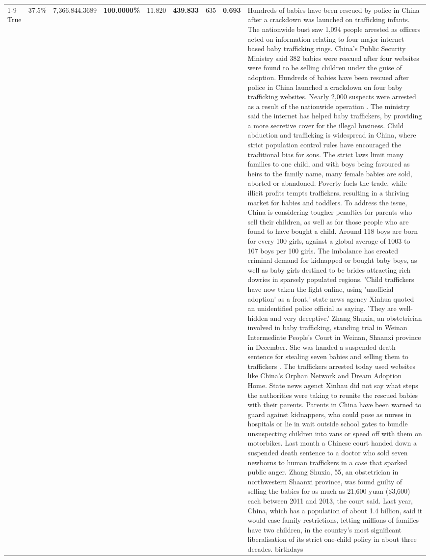 \begin{table}[H]
\begin{tabular}{lllrlllll}
\cline{1-9}
True & 37.5\% & 7,366,844.3689 & \bfseries \color{red} 100.0000\% & 11.820 & \bfseries \color{red} 439.833 & 635 & \bfseries \color{red} 0.693 & Hundreds of babies have been rescued by police in China after a crackdown was launched on trafficking infants. The nationwide bust saw 1,094 people arrested as officers acted on information relating to four major internet-based baby trafficking rings. China's Public Security Ministry said 382 babies were rescued after four websites were found to be selling children under the guise of adoption. Hundreds of babies have been rescued after police in China launched a crackdown on four baby trafficking websites. Nearly 2,000 suspects were arrested as a result of the nationwide operation . The ministry said the internet has helped baby traffickers, by providing a more secretive cover for the illegal business. Child abduction and trafficking is widespread in China, where strict population control rules have encouraged the traditional bias for sons. The strict laws limit many families to one child, and with boys being favoured as heirs to the family name, many female babies are sold, aborted or abandoned. Poverty fuels the trade, while illicit profits tempts traffickers, resulting in a thriving market for babies and toddlers. To address the issue, China is considering tougher penalties for parents who sell their children, as well as for those people who are found to have bought a child. Around 118 boys are born for every 100 girls, against a global average of 1003 to 107 boys per 100 girls. The imbalance has created criminal demand for kidnapped or bought baby boys, as well as baby girls destined to be brides attracting rich dowries in sparsely populated regions. 'Child traffickers have now taken the fight online, using 'unofficial adoption' as a front,' state news agency Xinhua quoted an unidentified police official as saying. 'They are well-hidden and very deceptive.' Zhang Shuxia, an obstetrician involved in baby trafficking, standing trial in Weinan Intermediate People's Court in Weinan, Shaanxi province in December. She was handed a suspended death sentence for stealing seven babies and selling them to traffickers . The traffickers arrested today used websites like China's Orphan Network and Dream Adoption Home. State news agenct Xinhau did not say what steps the authorities were taking to reunite the rescued babies with their parents. Parents in China have been warned to guard against kidnappers, who could pose as nurses in hospitals or lie in wait outside school gates to bundle unsuspecting children into vans or speed off with them on motorbikes. Last month a Chinese court handed down a suspended death sentence to a doctor who sold seven newborns to human traffickers in a case that sparked public anger. Zhang Shuxia, 55, an obstetrician in northwestern Shaanxi province, was found guilty of selling the babies for as much as 21,600 yuan (\$3,600) each between 2011 and 2013, the court said. Last year, China, which has a population of about 1.4 billion, said it would ease family restrictions, letting millions of families have two children, in the country's most significant liberalisation of its strict one-child policy in about three decades. birthdays \\

\end{tabular}
\end{table}
